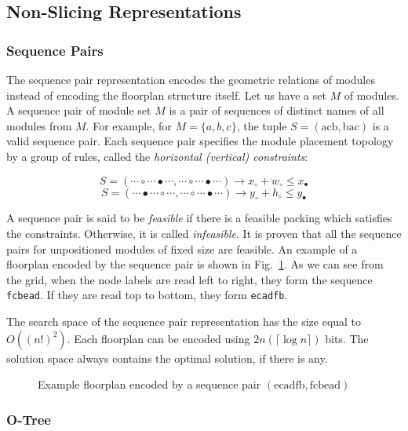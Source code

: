 \subsection{Non-Slicing Representations}

\subsubsection{Sequence Pairs}

The sequence pair representation encodes the geometric relations of modules instead of encoding the floorplan structure itself. Let us have a set $M$ of modules. A sequence pair of module set $M$ is a pair of sequences of distinct names of all modules from $M$. For example, for $M = \{a,b,c\}$, the tuple $S = (\mathrm{acb},\mathrm{bac})$ is a valid sequence pair. Each sequence pair specifies the module placement topology by a group of rules, called the {\em horizontal (vertical) constraints}:

$$ S = (\cdots \circ \cdots \bullet \cdots, \cdots \circ \cdots \bullet \cdots) \rightarrow x_\circ + w_\circ \leq x_\bullet $$
$$ S = (\cdots \bullet \cdots \circ \cdots, \cdots \circ \cdots \bullet \cdots) \rightarrow y_\circ + h_\circ \leq y_\bullet $$

A sequence pair is said to be {\em feasible} if there is a feasible packing which satisfies the constraints. Otherwise, it is called {\em infeasible}. It is proven \cite{nphard} that all the sequence pairs for unpositioned modules of fixed size are feasible. An example of a floorplan encoded by the sequence pair is shown in Fig.~\ref{fig:sp}. As we can see from the grid, when the node labels are read left to right, they form the sequence {\tt fcbead}. If they are read top to bottom, they form {\tt ecadfb}.

The search space of the sequence pair representation \cite{otree} has the size equal to $O((n!)^2)$. Each floorplan can be encoded using $2n(\lceil\log n\rceil)$ bits. The solution space always contains the optimal solution, if there is any.

\begin{figure}
\centering
{} \hfill
{}
\caption{Example floorplan encoded by a sequence pair $(\mathrm{ecadfb}, \mathrm{fcbead})$}
\label{fig:sp}
\end{figure}

\subsubsection{O-Tree}

